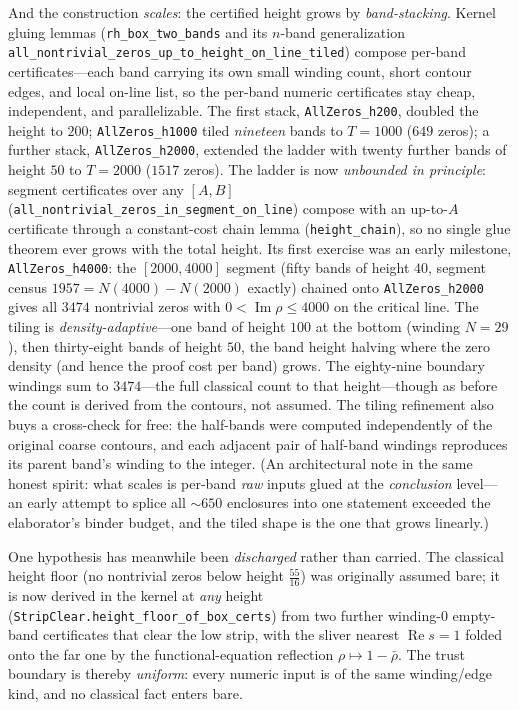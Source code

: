 And the construction \emph{scales}: the certified height grows by
\emph{band-stacking}. Kernel gluing lemmas (\texttt{rh\_box\_two\_bands} and its
$n$-band generalization
\texttt{all\_nontrivial\_zeros\_up\_to\allowbreak\_height\_on\_line\_tiled}) compose
per-band certificates---each band carrying its own small winding count, short
contour edges, and local on-line list, so the per-band numeric certificates stay
cheap, independent, and parallelizable. The first stack, \texttt{AllZeros\_h200},
doubled the height to $200$; \texttt{AllZeros\_h1000} tiled \emph{nineteen}
bands to $T = 1000$ ($649$ zeros); a further stack,
\texttt{AllZeros\_h2000}, extended the ladder with twenty further bands of height
$50$ to $T = 2000$ ($1517$ zeros). The ladder is now \emph{unbounded in
principle}: segment certificates over any $[A, B]$
(\texttt{all\_nontrivial\_zeros\_in\allowbreak\_segment\_on\_line}) compose with an
up-to-$A$ certificate through a constant-cost chain lemma
(\texttt{height\_chain}), so no single glue theorem ever grows with the total
height. Its first exercise was an early milestone, \texttt{AllZeros\_h4000}:
the $[2000, 4000]$ segment (fifty bands of height $40$, segment census
$1957 = N(4000) - N(2000)$ exactly) chained onto \texttt{AllZeros\_h2000} gives
all $3474$ nontrivial zeros with $0 < \operatorname{Im}\rho \le 4000$ on the
critical line. The tiling is
\emph{density-adaptive}---one band of height $100$ at the bottom (winding
$N = 29$), then thirty-eight bands of height $50$, the band height halving where
the zero density (and hence the proof cost per band) grows. The eighty-nine
boundary windings sum to $3474$---the full classical count to that
height---though as before the count is derived from the contours, not assumed.
The tiling refinement also buys a cross-check for free: the half-bands were
computed independently of the original coarse contours, and each adjacent pair
of half-band windings reproduces its parent band's winding to the integer. (An
architectural note in the same honest spirit: what scales is per-band \emph{raw}
inputs glued at the \emph{conclusion} level---an early attempt to splice all
$\sim 650$ enclosures into one statement exceeded the elaborator's binder budget,
and the tiled shape is the one that grows linearly.)

One hypothesis has meanwhile been \emph{discharged} rather than carried. The
classical height floor (no nontrivial zeros below height $\tfrac{55}{16}$) was
originally assumed bare; it is now derived in the kernel at \emph{any} height
(\texttt{StripClear.height\_floor\_of\_box\_certs}) from two further winding-$0$
empty-band certificates that clear the low strip, with the sliver nearest
$\operatorname{Re} s = 1$ folded onto the far one by the functional-equation
reflection $\rho \mapsto 1 - \bar\rho$. The trust boundary is thereby
\emph{uniform}: every numeric input is of the same winding/edge kind, and no
classical fact enters bare.

